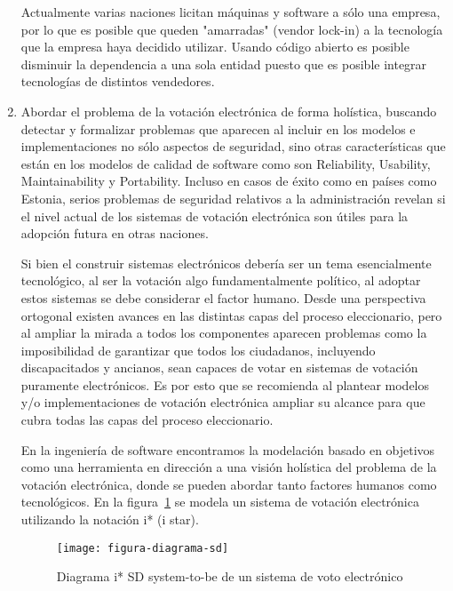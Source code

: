\begin{enumerate}
		Actualmente varias naciones licitan máquinas y software a sólo una empresa, por lo que 
		es posible que queden "amarradas" (vendor lock-in) a la tecnología que la empresa haya
		decidido utilizar. Usando código abierto es posible disminuir la dependencia a una sola entidad
		puesto que es posible integrar tecnologías de distintos vendedores. \cite{Langer2010}

		
	\item Abordar el problema de la votación electrónica de forma holística, buscando detectar y formalizar problemas que aparecen al incluir en los modelos e implementaciones
		no sólo aspectos de seguridad, sino otras características que están en los modelos de
		calidad de software como son Reliability, Usability, Maintainability y Portability. Incluso en
		casos de éxito como en países como Estonia, serios problemas de seguridad relativos
		a la administración revelan si el nivel actual de los sistemas de votación electrónica
		son útiles para la adopción futura en otras naciones.\cite{Schryen2009} 
		
		Si bien el construir sistemas electrónicos debería ser un tema esencialmente tecnológico,
		al ser la votación algo fundamentalmente político, al adoptar estos sistemas se debe 
		considerar el factor humano.	Desde una perspectiva ortogonal existen avances en las distintas capas del proceso 
		eleccionario, pero al ampliar la mirada a todos los componentes aparecen problemas
		como la imposibilidad de garantizar que todos los ciudadanos, incluyendo discapacitados
		y ancianos, sean capaces de votar en sistemas de votación puramente electrónicos. Es por esto
		que se recomienda al plantear modelos y/o implementaciones de votación electrónica 
		ampliar su alcance para que cubra todas las capas del proceso eleccionario.	
		
		En la ingeniería de software encontramos la modelación basado en objetivos como una herramienta
		en dirección a una visión holística del problema de la votación electrónica, donde se pueden
		abordar tanto factores humanos como tecnológicos. En la figura~\ref{fig:diagrama-sd} se modela
		un sistema de votación electrónica utilizando la notación i* (i star).
		
\begin{figure}[h!]
	\centering
	\texttt{[image: figura-diagrama-sd]}
	\caption{Diagrama i* SD system-to-be de un sistema de voto electrónico}
	\label{fig:diagrama-sd}
\end{figure}
\bigskip


\end{enumerate}
